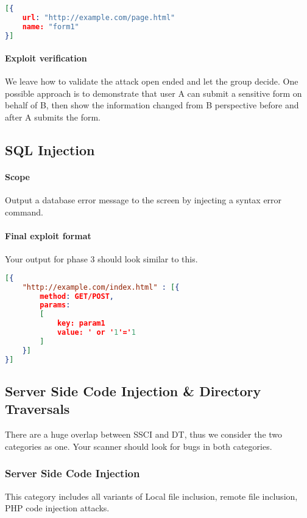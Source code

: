\documentclass{article}[10pt]
\begin{document}
\begin{lstlisting}[language=json,firstnumber=1]
[{
	url: "http://example.com/page.html"
	name: "form1"
}]
\end{lstlisting}

\paragraph{Exploit verification} We leave how to validate the attack open ended and let the group decide. One possible approach is to demonstrate that user A can submit a sensitive form on behalf of B, then show the information changed from B perspective before and after A submits the form.

\subsection{SQL Injection}
\paragraph{Scope} Output a database error message to the screen by injecting a syntax error command.

\paragraph{Final exploit format} Your output for phase 3 should look similar to this.

\begin{lstlisting}[language=json,firstnumber=1]
[{
	"http://example.com/index.html" : [{
		method: GET/POST,
		params: 
		[
			key: param1
			value: ' or '1'='1
		]
	}]
}]
\end{lstlisting}
\subsection{Server Side Code Injection \& Directory Traversals}
There are a huge overlap between SSCI and DT, thus we consider the two categories as one. Your scanner should look for bugs in both categories.

\subsubsection{Server Side Code Injection}
This category includes all variants of Local file inclusion, remote file inclusion, PHP code injection attacks.
\end{document}
